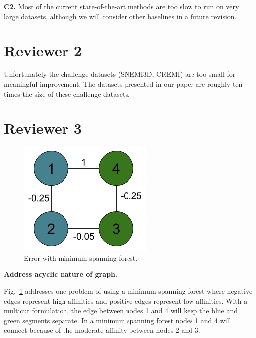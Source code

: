 \documentclass[10pt,twocolumn,letterpaper]{article}
\begin{document}
\textbf{C2.} Most of the current state-of-the-art methods are too slow to run on very large datasets, although we will consider other baselines in a future revision.

\section*{Reviewer 2}

Unfortunately the challenge datasets (SNEMI3D, CREMI) are too small for meaningful improvement. The datasets presented in our paper are roughly ten times the size of these challenge datasets. 

\section*{Reviewer 3}

\begin{figure}[h]
	\begin{center}
		\includegraphics[width=0.32\linewidth]{./figures/MSF.png}
		\caption{Error with minimum spanning forest.}
		\label{figure:msf}
	\end{center}
\end{figure}

\textbf{Address acyclic nature of graph.}

Fig.~\ref{figure:msf} addresses one problem of using a minimum spanning forest where negative edges represent high affinities and positive edges represent low affinities. 
With a multicut formulation, the edge between nodes 1 and 4 will keep the blue and green segments separate.
In a minimum spanning forest nodes 1 and 4 will connect because of the moderate affinity between nodes 2 and 3.

{\small


}
\end{document}
